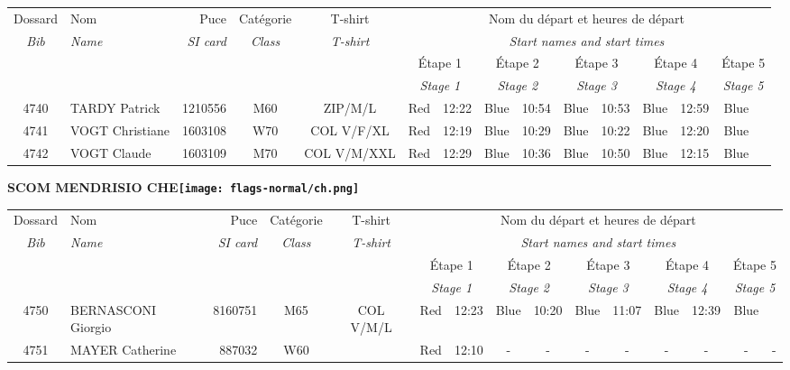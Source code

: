\documentclass{report}
\begin{document}
  \begin{longtable}{|c|l|r|c|c|*{5}{cc|}}
    Dossard & Nom  & Puce    & Catégorie & T-shirt & \multicolumn{10}{c|}{Nom du départ et heures de départ} \\
    \itshape Bib     & \itshape Name & \itshape SI card & \itshape Class  & \itshape  T-shirt  & \multicolumn{10}{c|}{\itshape Start names and start times} \\
    \hline
    & & & & & \multicolumn{2}{c|}{Étape 1} & \multicolumn{2}{c|}{Étape 2} & \multicolumn{2}{c|}{Étape 3} & \multicolumn{2}{c|}{Étape 4} & \multicolumn{2}{c|}{Étape 5} \\
    & & & & & \multicolumn{2}{c|}{\itshape Stage 1} & \multicolumn{2}{c|}{\itshape Stage 2} & \multicolumn{2}{c|}{\itshape Stage 3} & \multicolumn{2}{c|}{\itshape Stage 4} & \multicolumn{2}{c|}{\itshape Stage 5} \\
    \hline
    4740 & TARDY Patrick & 1210556 & M60 & ZIP/M/L & Red & 12:22 & Blue & 10:54 & Blue & 10:53 & Blue & 12:59 & Blue &  \\
    4741 & VOGT Christiane & 1603108 & W70 & COL V/F/XL & Red & 12:19 & Blue & 10:29 & Blue & 10:22 & Blue & 12:20 & Blue &  \\
    4742 & VOGT Claude & 1603109 & M70 & COL V/M/XXL & Red & 12:29 & Blue & 10:36 & Blue & 10:50 & Blue & 12:15 & Blue &  \\
  \end{longtable}
\newpage
  \Huge \centering \bfseries SCOM MENDRISIO  CHE\normalfont \footnotesize \sffamily \hfill \texttt{[image: flags-normal/ch.png]} \newline 
  \begin{longtable}{|c|l|r|c|c|*{5}{cc|}}
    Dossard & Nom  & Puce    & Catégorie & T-shirt & \multicolumn{10}{c|}{Nom du départ et heures de départ} \\
    \itshape Bib     & \itshape Name & \itshape SI card & \itshape Class  & \itshape  T-shirt  & \multicolumn{10}{c|}{\itshape Start names and start times} \\
    \hline
    & & & & & \multicolumn{2}{c|}{Étape 1} & \multicolumn{2}{c|}{Étape 2} & \multicolumn{2}{c|}{Étape 3} & \multicolumn{2}{c|}{Étape 4} & \multicolumn{2}{c|}{Étape 5} \\
    & & & & & \multicolumn{2}{c|}{\itshape Stage 1} & \multicolumn{2}{c|}{\itshape Stage 2} & \multicolumn{2}{c|}{\itshape Stage 3} & \multicolumn{2}{c|}{\itshape Stage 4} & \multicolumn{2}{c|}{\itshape Stage 5} \\
    \hline
    4750 & BERNASCONI Giorgio & 8160751 & M65 & COL V/M/L & Red & 12:23 & Blue & 10:20 & Blue & 11:07 & Blue & 12:39 & Blue &  \\
    4751 & MAYER Catherine & 887032 & W60 &   & Red & 12:10 & - &  - & - &  - & - &  - & - &  -\\
  \end{longtable}
\end{document}
